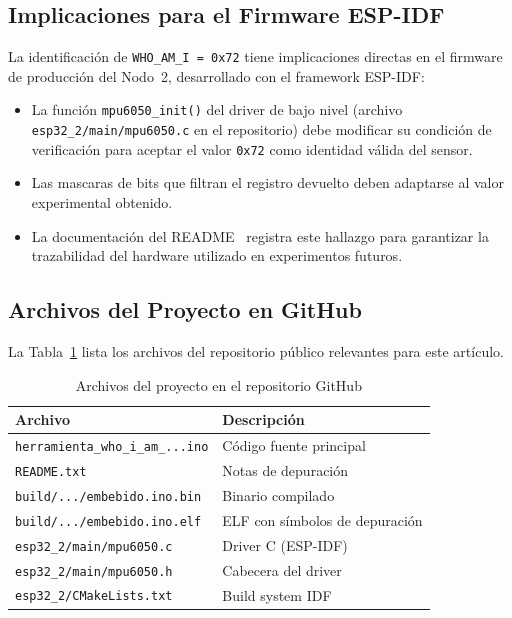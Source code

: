 \documentclass[10pt,twocolumn,a4paper]{article}
\begin{document}
\subsection{Implicaciones para el Firmware ESP-IDF}

La identificación de \texttt{WHO\_AM\_I = 0x72} tiene implicaciones
directas en el firmware de producción del Nodo~2, desarrollado con el
framework ESP-IDF:

\begin{itemize}
  \item La función \texttt{mpu6050\_init()} del driver de bajo nivel
        (archivo \texttt{esp32\_2/main/mpu6050.c} en el repositorio)
        debe modificar su condición de verificación para aceptar el
        valor \texttt{0x72} como identidad válida del sensor.
  \item Las mascaras de bits que filtran el registro devuelto deben
        adaptarse al valor experimental obtenido.
  \item La documentación del README~\cite{readme_debug} registra este
        hallazgo para garantizar la trazabilidad del hardware utilizado
        en experimentos futuros.
\end{itemize}

\subsection{Archivos del Proyecto en GitHub}

La Tabla~\ref{tab:archivos} lista los archivos del repositorio público
relevantes para este artículo.

\begin{table}[H]
\centering
\caption{Archivos del proyecto en el repositorio GitHub}
\label{tab:archivos}
\scriptsize
\begin{tabular}{p{3.5cm}p{3.0cm}}
\toprule
\textbf{Archivo} & \textbf{Descripción} \\
\midrule
\texttt{herramienta\_who\_i\_am\_...ino} & Código fuente principal \\
\texttt{README.txt} & Notas de depuración \\
\texttt{build/.../embebido.ino.bin} & Binario compilado \\
\texttt{build/.../embebido.ino.elf} & ELF con símbolos de depuración \\
\texttt{esp32\_2/main/mpu6050.c} & Driver C (ESP-IDF) \\
\texttt{esp32\_2/main/mpu6050.h} & Cabecera del driver \\
\texttt{esp32\_2/CMakeLists.txt} & Build system IDF \\
\bottomrule
\end{tabular}
\end{table}
\end{document}

